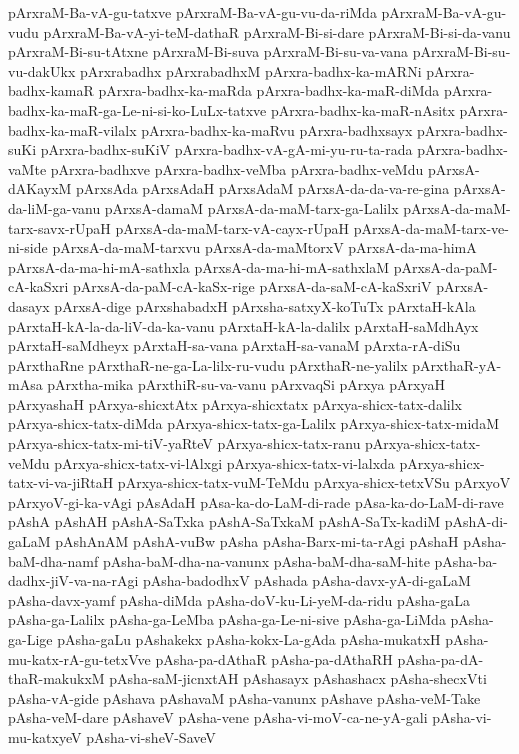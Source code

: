 {pArxraM-Ba-vA-gu-tatxve
pArxraM-Ba-vA-gu-vu-da-riMda
pArxraM-Ba-vA-gu-vudu
pArxraM-Ba-vA-yi-teM-dathaR
pArxraM-Bi-si-dare
pArxraM-Bi-si-da-vanu
pArxraM-Bi-su-tAtxne
pArxraM-Bi-suva
pArxraM-Bi-su-va-vana
pArxraM-Bi-su-vu-dakUkx
pArxrabadhx
pArxrabadhxM
pArxra-badhx-ka-mARNi
pArxra-badhx-kamaR
pArxra-badhx-ka-maRda
pArxra-badhx-ka-maR-diMda
pArxra-badhx-ka-maR-ga-Le-ni-si-ko-LuLx-tatxve
pArxra-badhx-ka-maR-nAsitx
pArxra-badhx-ka-maR-vilalx
pArxra-badhx-ka-maRvu
pArxra-badhxsayx
pArxra-badhx-suKi
pArxra-badhx-suKiV
pArxra-badhx-vA-gA-mi-yu-ru-ta-rada
pArxra-badhx-vaMte
pArxra-badhxve
pArxra-badhx-veMba
pArxra-badhx-veMdu
pArxsA-dAKayxM
pArxsAda
pArxsAdaH
pArxsAdaM
pArxsA-da-da-va-re-gina
pArxsA-da-liM-ga-vanu
pArxsA-damaM
pArxsA-da-maM-tarx-ga-Lalilx
pArxsA-da-maM-tarx-savx-rUpaH
pArxsA-da-maM-tarx-vA-cayx-rUpaH
pArxsA-da-maM-tarx-ve-ni-side
pArxsA-da-maM-tarxvu
pArxsA-da-maMtorxV
pArxsA-da-ma-himA
pArxsA-da-ma-hi-mA-sathxla
pArxsA-da-ma-hi-mA-sathxlaM
pArxsA-da-paM-cA-kaSxri
pArxsA-da-paM-cA-kaSx-rige
pArxsA-da-saM-cA-kaSxriV
pArxsA-dasayx
pArxsA-dige
pArxshabadxH
pArxsha-satxyX-koTuTx
pArxtaH-kAla
pArxtaH-kA-la-da-liV-da-ka-vanu
pArxtaH-kA-la-dalilx
pArxtaH-saMdhAyx
pArxtaH-saMdheyx
pArxtaH-sa-vana
pArxtaH-sa-vanaM
pArxta-rA-diSu
pArxthaRne
pArxthaR-ne-ga-La-lilx-ru-vudu
pArxthaR-ne-yalilx
pArxthaR-yA-mAsa
pArxtha-mika
pArxthiR-su-va-vanu
pArxvaqSi
pArxya
pArxyaH
pArxyashaH
pArxya-shicxtAtx
pArxya-shicxtatx
pArxya-shicx-tatx-dalilx
pArxya-shicx-tatx-diMda
pArxya-shicx-tatx-ga-Lalilx
pArxya-shicx-tatx-midaM
pArxya-shicx-tatx-mi-tiV-yaRteV
pArxya-shicx-tatx-ranu
pArxya-shicx-tatx-veMdu
pArxya-shicx-tatx-vi-lAlxgi
pArxya-shicx-tatx-vi-lalxda
pArxya-shicx-tatx-vi-va-jiRtaH
pArxya-shicx-tatx-vuM-TeMdu
pArxya-shicx-tetxVSu
pArxyoV
pArxyoV-gi-ka-vAgi
pAsAdaH
pAsa-ka-do-LaM-di-rade
pAsa-ka-do-LaM-di-rave
pAshA
pAshAH
pAshA-SaTxka
pAshA-SaTxkaM
pAshA-SaTx-kadiM
pAshA-di-gaLaM
pAshAnAM
pAshA-vuBw
pAsha
pAsha-Barx-mi-ta-rAgi
pAshaH
pAsha-baM-dha-namf
pAsha-baM-dha-na-vanunx
pAsha-baM-dha-saM-hite
pAsha-ba-dadhx-jiV-va-na-rAgi
pAsha-badodhxV
pAshada
pAsha-davx-yA-di-gaLaM
pAsha-davx-yamf
pAsha-diMda
pAsha-doV-ku-Li-yeM-da-ridu
pAsha-gaLa
pAsha-ga-Lalilx
pAsha-ga-LeMba
pAsha-ga-Le-ni-sive
pAsha-ga-LiMda
pAsha-ga-Lige
pAsha-gaLu
pAshakekx
pAsha-kokx-La-gAda
pAsha-mukatxH
pAsha-mu-katx-rA-gu-tetxVve
pAsha-pa-dAthaR
pAsha-pa-dAthaRH
pAsha-pa-dA-thaR-makukxM
pAsha-saM-jicnxtAH
pAshasayx
pAshashacx
pAsha-shecxVti
pAsha-vA-gide
pAshava
pAshavaM
pAsha-vanunx
pAshave
pAsha-veM-Take
pAsha-veM-dare
pAshaveV
pAsha-vene
pAsha-vi-moV-ca-ne-yA-gali
pAsha-vi-mu-katxyeV
pAsha-vi-sheV-SaveV
}

